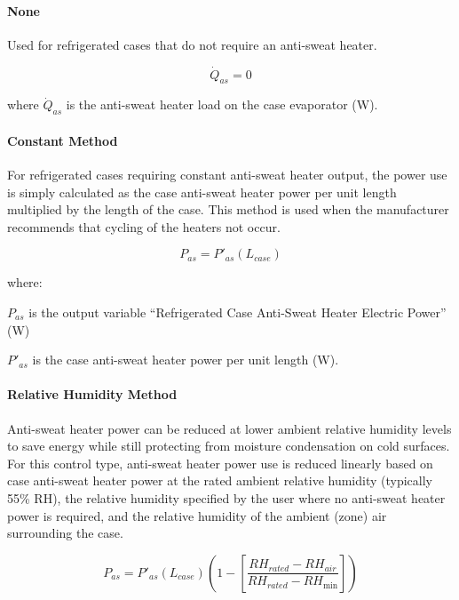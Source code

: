 \paragraph{None}\label{none}

Used for refrigerated cases that do not require an anti-sweat heater.

\begin{equation}
{\dot Q_{as}} = 0
\end{equation}

where \({\dot Q_{as}}\) is the anti-sweat heater load on the case evaporator (W).

\paragraph{Constant Method}\label{constant-method}

For refrigerated cases requiring constant anti-sweat heater output, the power use is simply calculated as the case anti-sweat heater power per unit length multiplied by the length of the case. This method is used when the manufacturer recommends that cycling of the heaters not occur.

\begin{equation}
{P_{as}} = {P'}_{as} \left( {{L_{case}}} \right)
\end{equation}

where:

\({P_{as}}\) is the output variable ``Refrigerated Case Anti-Sweat Heater Electric Power'' (W)

\({P'}_{as}\) is the case anti-sweat heater power per unit length (W).

\paragraph{Relative Humidity Method}\label{relative-humidity-method}

Anti-sweat heater power can be reduced at lower ambient relative humidity levels to save energy while still protecting from moisture condensation on cold surfaces. For this control type, anti-sweat heater power use is reduced linearly based on case anti-sweat heater power at the rated ambient relative humidity (typically 55\% RH), the relative humidity specified by the user where no anti-sweat heater power is required, and the relative humidity of the ambient (zone) air surrounding the case.

\begin{equation}
{P_{as}} = {P'}_{as}\left( {{L_{case}}} \right)\left( {1 - \left[ {\frac{{R{H_{rated}} - R{H_{air}}}}{{R{H_{rated}} - R{H_{\min }}}}} \right]} \right)
\end{equation}

